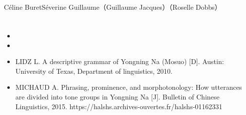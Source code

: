 	\section{ } \label{sec:thks}
	
 Céline BuretSéverine Guillaume（Guillaume Jacques）（Roselle Dobbs）
	

	\section{} \label{sec:refs}
	\begin{itemize}
		\item {}
		\item {}
		\item LIDZ L. A descriptive grammar of Yongning Na (Mosuo) [D]. Austin: University of Texas, Department of linguistics, 2010.
		\item MICHAUD A. Phrasing, prominence, and morphotonology: How utterances are divided into tone groups in Yongning Na [J]. Bulletin of Chinese Linguistics, 2015. https://halshs.archives-ouvertes.fr/halshs-01162331
	\end{itemize}


 

	

